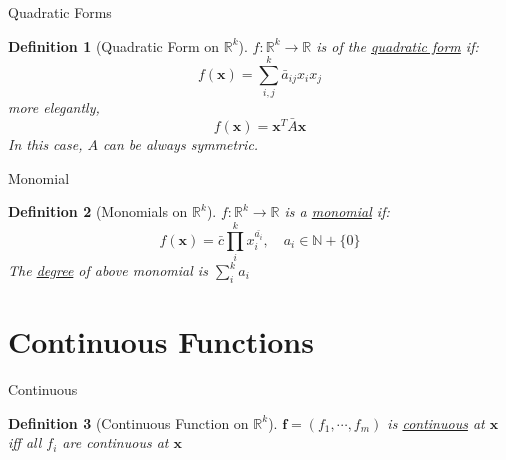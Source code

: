 \documentclass[a4paper,11pt]{article}
\newtheorem{defn}{Definition}
\begin{document}
\begin{frame}[t]{Quadratic Forms}
	\begin{defn}
		[Quadratic Form on $\mathbb{R}^k$]
		$f:\mathbb{R}^k\rightarrow\mathbb{R}$ is of the \uline{quadratic form} if:
		\[
			f(\mathbf{x})=\sum_{i,j}^k \bar a_{ij} x_i x_j
		\]more elegantly, 
		\[
			f(\mathbf{x}) = \mathbf{x}^T \bar A \mathbf{x}
		\]
		In this case, $A$ can be always symmetric.
	\end{defn}
\end{frame}
\begin{frame}[t]{Monomial}
	\begin{defn}
		[Monomials on $\mathbb{R}^k$]
		$f:\mathbb{R}^k\rightarrow\mathbb{R}$ is a \uline{monomial} if:\[
			f(\mathbf{x})= \bar c \prod_{i}^k x_i^{\bar{a_i}}, \quad a_i\in\mathbb{N}+\{0\}
		\]
		The \uline{degree} of above monomial is $\sum_i^k a_i$
	\end{defn}
\end{frame}

\section{Continuous Functions} %
\label{sec:continuous_functions}
\begin{frame}[t]{Continuous}
	\begin{defn}
		[Continuous Function on $\mathbb{R}^k$]
		$\mathbf{f}=(f_1,\cdots,f_m)$ is \uline{continuous} at $\mathbf{x}$ iff all $f_i$ are continuous at $\mathbf{x}$
	\end{defn}
\end{frame}

%
\end{document}
